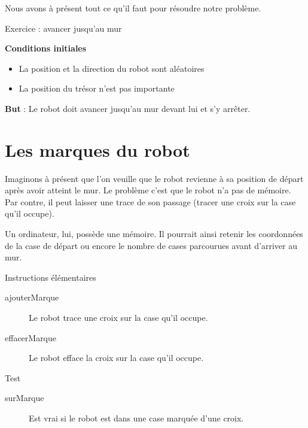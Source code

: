 	Nous avons à présent tout ce qu'il faut pour résoudre
	notre problème.

	\begin{Emphase}{Exercice : avancer jusqu'au mur}

		\textbf{Conditions initiales}

		\begin{itemize}
		\item La position et la direction du robot sont aléatoires
		\item La position du trésor n'est pas importante
		\end{itemize}
		
		\textbf{But} : Le robot doit avancer jusqu'au mur
		devant lui et s'y arrêter.

	\end{Emphase}

\section{Les marques du robot}

	Imaginons à présent que l'on veuille que le robot
	revienne à sa position de départ après avoir atteint le mur. Le
	problème c'est que le robot n'a pas
	de mémoire. Par contre, il peut laisser une trace de son passage
	(tracer une croix sur la case qu'il occupe).
	
	Un ordinateur, lui, possède une mémoire. Il pourrait ainsi retenir les
	coordonnées de la case de départ ou encore le nombre de cases
	parcourues avant d'arriver au mur.

	\begin{Emphase}{Instructions élémentaires}
		\begin{description}
		\item[ajouterMarque] 
			Le robot trace une croix sur la case qu'il occupe.
		\item[effacerMarque]
			Le robot efface la croix sur la case qu'il occupe.
		\end{description}
	\end{Emphase}

	\begin{Emphase}{Test}
		\begin{description}
		\item[surMarque] 
			Est vrai si le robot est dans une case marquée d'une croix.
		\end{description}
	\end{Emphase}

